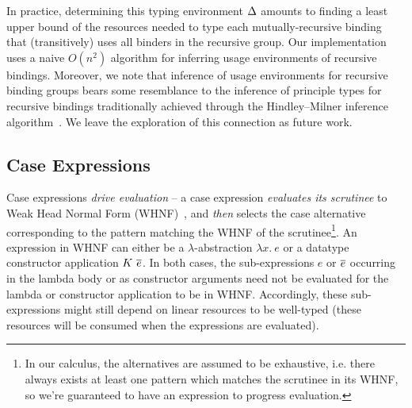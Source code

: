 \documentclass[acmsmall,review,anonymous,screen]{acmart}
\begin{document}
In practice, determining this typing environment $\Delta$ amounts to finding a
least upper bound of the resources needed to type each mutually-recursive
binding that (transitively) uses all binders in the recursive group.
%
Our implementation uses a naive $O(n^2)$ algorithm for inferring usage
environments of recursive bindings.
%
%
Moreover, we note that inference of usage environments for recursive binding
groups bears some resemblance to the inference of principle types for recursive
bindings traditionally achieved through the Hindley–Milner inference
algorithm~\cite{DBLP:conf/popl/DamasM82}. %
We leave the exploration of this connection
as future work.


\subsection{Case Expressions\label{sec:lc-case-exps}}

Case expressions \emph{drive evaluation} --
%
%
%
a case expression \emph{evaluates its scrutinee} to Weak Head Normal
Form (WHNF)~\cite{10.5555/1096899}, and \emph{then} selects the case
alternative corresponding to the pattern matching the WHNF of the
scrutinee\footnote{In our calculus, the alternatives are assumed to be
  exhaustive, i.e. there always exists at least one pattern which
  matches the scrutinee in its WHNF, so we're guaranteed to have an
  expression to progress evaluation.}. An expression in WHNF can either be %
a $\lambda$-abstraction $\lambda x.~e$ 
or a datatype constructor application $K~\overline{e}$.
In both cases, the sub-expressions $e$ or $\overline{e}$ occurring in the lambda body
or as constructor arguments need not be evaluated for the lambda or constructor
application to be in WHNF. %
%
Accordingly, these sub-expressions might still depend on linear resources to be
well-typed (these resources will be consumed when the expressions are evaluated).
\end{document}
